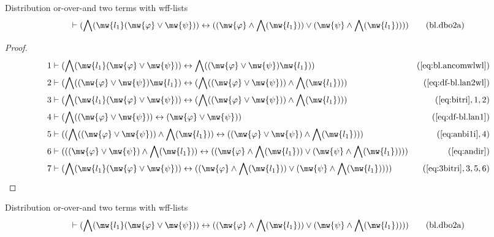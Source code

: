 \begin{lemma} Distribution or-over-and two terms with
wff-lists
\begin{align}
\vdash ( \bigwedge( \mw{l_1} ( \mw{\varphi} \vee \mw{\psi} ) ) \leftrightarrow ( (
    \mw{\varphi} \wedge \bigwedge( \mw{l_1} ) ) \vee ( \mw{\psi} \wedge \bigwedge(
    \mw{l_1} ) ) ) )\label{eq:bl.dbo2a}\tag{bl.dbo2a}
\end{align}
\end{lemma}

\begin{proof}
\begin{align}
  1 & \vdash ( \bigwedge( \mw{l_1} ( \mw{\varphi} \vee \mw{\psi} ) ) \leftrightarrow
    \bigwedge( ( \mw{\varphi} \vee \mw{\psi} ) \mw{l_1} )
    )&(\mbox{\ref{eq:bl.ancomwlwl}})\notag
  \\ 2 & \vdash ( \bigwedge( ( \mw{\varphi} \vee \mw{\psi} ) \mw{l_1} )
    \leftrightarrow ( \bigwedge( ( \mw{\varphi} \vee \mw{\psi} ) )
    \wedge \bigwedge( \mw{l_1} ) )
    )&(\mbox{\ref{eq:df-bl.lan2wl}})\notag
  \\ 3 & \vdash ( \bigwedge( \mw{l_1} ( \mw{\varphi} \vee \mw{\psi} ) )
    \leftrightarrow ( \bigwedge( ( \mw{\varphi} \vee \mw{\psi} ) )
    \wedge \bigwedge( \mw{l_1} ) )
    )&(\mbox{\ref{eq:bitri}},1,2)\notag
  \\ 4 & \vdash ( \bigwedge( ( \mw{\varphi} \vee \mw{\psi} ) ) \leftrightarrow (
    \mw{\varphi} \vee \mw{\psi} )
    )&(\mbox{\ref{eq:df-bl.lan1}})\notag
  \\ 5 & \vdash ( ( \bigwedge( ( \mw{\varphi} \vee \mw{\psi} ) ) \wedge \bigwedge(
    \mw{l_1} ) ) \leftrightarrow ( ( \mw{\varphi} \vee \mw{\psi} )
    \wedge \bigwedge( \mw{l_1} ) )
    )&(\mbox{\ref{eq:anbi1i}},4)\notag
  \\ 6 & \vdash ( ( ( \mw{\varphi} \vee \mw{\psi} ) \wedge \bigwedge( \mw{l_1} ) )
    \leftrightarrow ( ( \mw{\varphi} \wedge \bigwedge(
    \mw{l_1} ) ) \vee ( \mw{\psi} \wedge \bigwedge( \mw{l_1} )
    ) ) )&(\mbox{\ref{eq:andir}})\notag
  \\ 7 & \vdash ( \bigwedge( \mw{l_1} ( \mw{\varphi} \vee \mw{\psi} ) )
    \leftrightarrow ( ( \mw{\varphi} \wedge \bigwedge(
    \mw{l_1} ) ) \vee ( \mw{\psi} \wedge \bigwedge( \mw{l_1} )
    ) ) )&(\mbox{\ref{eq:3bitri}},3,5,6)\notag
\end{align}
\end{proof}

\begin{lemma} Distribution or-over-and two terms with
wff-lists
\begin{align}
\vdash ( \bigwedge( \mw{l_1} ( \mw{\varphi} \vee \mw{\psi} ) ) \leftrightarrow
    ( ( \mw{\varphi} \wedge \bigwedge( \mw{l_1} ) ) \vee ( \mw{\psi} \wedge
    \bigwedge( \mw{l_1} ) ) ) )\label{eq:bl.dbo2a}\tag{bl.dbo2a}
\end{align}
\end{lemma}

